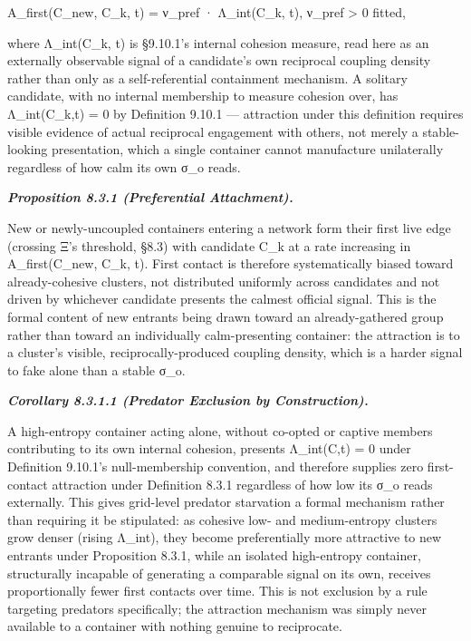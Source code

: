 \documentclass[
]{article}
\begin{document}
A\_first(C\_new, C\_k, t) = ν\_pref · Λ\_int(C\_k, t), ν\_pref
\textgreater{} 0 fitted,

where Λ\_int(C\_k, t) is §9.10.1's internal cohesion measure, read here
as an externally observable signal of a candidate's own reciprocal
coupling density rather than only as a self-referential containment
mechanism. A solitary candidate, with no internal membership to measure
cohesion over, has Λ\_int(C\_k,t) = 0 by Definition 9.10.1 ---
attraction under this definition requires visible evidence of actual
reciprocal engagement with others, not merely a stable-looking
presentation, which a single container cannot manufacture unilaterally
regardless of how calm its own σ\_o reads.

\emph{\textbf{Proposition 8.3.1 (Preferential Attachment).}}

New or newly-uncoupled containers entering a network form their first
live edge (crossing Ξ's threshold, §8.3) with candidate C\_k at a rate
increasing in A\_first(C\_new, C\_k, t). First contact is therefore
systematically biased toward already-cohesive clusters, not distributed
uniformly across candidates and not driven by whichever candidate
presents the calmest official signal. This is the formal content of new
entrants being drawn toward an already-gathered group rather than toward
an individually calm-presenting container: the attraction is to a
cluster's visible, reciprocally-produced coupling density, which is a
harder signal to fake alone than a stable σ\_o.

\emph{\textbf{Corollary 8.3.1.1 (Predator Exclusion by Construction).}}

A high-entropy container acting alone, without co-opted or captive
members contributing to its own internal cohesion, presents Λ\_int(C,t)
= 0 under Definition 9.10.1's null-membership convention, and therefore
supplies zero first-contact attraction under Definition 8.3.1 regardless
of how low its σ\_o reads externally. This gives grid-level predator
starvation a formal mechanism rather than requiring it be stipulated: as
cohesive low- and medium-entropy clusters grow denser (rising Λ\_int),
they become preferentially more attractive to new entrants under
Proposition 8.3.1, while an isolated high-entropy container,
structurally incapable of generating a comparable signal on its own,
receives proportionally fewer first contacts over time. This is not
exclusion by a rule targeting predators specifically; the attraction
mechanism was simply never available to a container with nothing genuine
to reciprocate.
\end{document}
